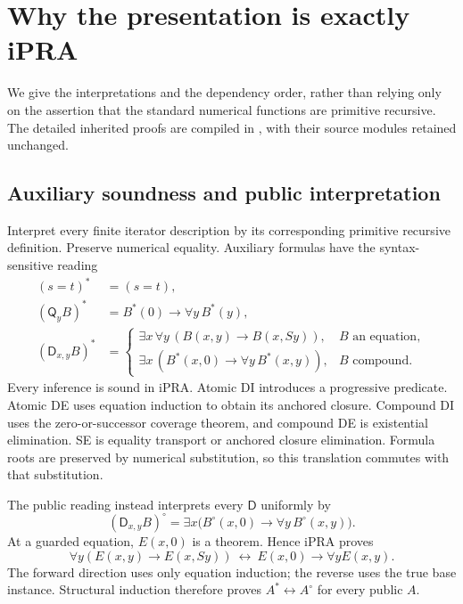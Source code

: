 \documentclass[11pt,letterpaper]{article}
\theoremstyle{definition}\newtheorem{definition}[theorem]{Definition}
\theoremstyle{remark}\newtheorem{remark}[theorem]{Remark}
\newcommand{\Q}{\mathsf Q}
\newcommand{\D}{\mathsf D}
\newcommand{\file}[1]{{\small\path{#1}}}
\begin{document}
\section{Why the presentation is exactly iPRA}
\label{sec:equivalence}

We give the interpretations and the dependency order, rather than relying
only on the assertion that the standard numerical functions are primitive
recursive. The detailed inherited proofs are compiled in
\file{foundations.pdf}, with their source modules retained unchanged.

\subsection{Auxiliary soundness and public interpretation}

Interpret every finite iterator description by its corresponding primitive
recursive definition. Preserve numerical equality. Auxiliary formulas have
the syntax-sensitive reading
\begin{align*}
 (s=t)^*&=(s=t),\\
 (\Q_yB)^*&=B^*(0)\to\forall y\,B^*(y),\\
 (\D_{x,y}B)^*&=
 \begin{cases}
 \exists x\,\forall y\,(B(x,y)\to B(x,Sy)),&B\text{ an equation},\\
 \exists x\,(B^*(x,0)\to\forall y\,B^*(x,y)),&B\text{ compound}.
 \end{cases}
\end{align*}
Every inference is sound in iPRA. Atomic DI introduces a progressive
predicate. Atomic DE uses equation induction to obtain its anchored
closure. Compound DI uses the zero-or-successor coverage theorem, and
compound DE is existential elimination. SE is equality transport or anchored
closure elimination. Formula roots are preserved by numerical substitution,
so this translation commutes with that substitution.

The public reading instead interprets every $\D$ uniformly by
\begin{equation}
 (\D_{x,y}B)^\circ
   =\exists x\bigl(B^\circ(x,0)\to\forall y\,B^\circ(x,y)\bigr).
 \label{eq:ordinary}
\end{equation}
At a guarded equation, $E(x,0)$ is a theorem. Hence iPRA proves
\[
 \forall y(E(x,y)\to E(x,Sy))
 \ \longleftrightarrow\
 E(x,0)\to\forall yE(x,y).
\]
The forward direction uses only equation induction; the reverse uses the
true base instance. Structural induction therefore proves
$A^*\leftrightarrow A^\circ$ for every public $A$.
\end{document}
